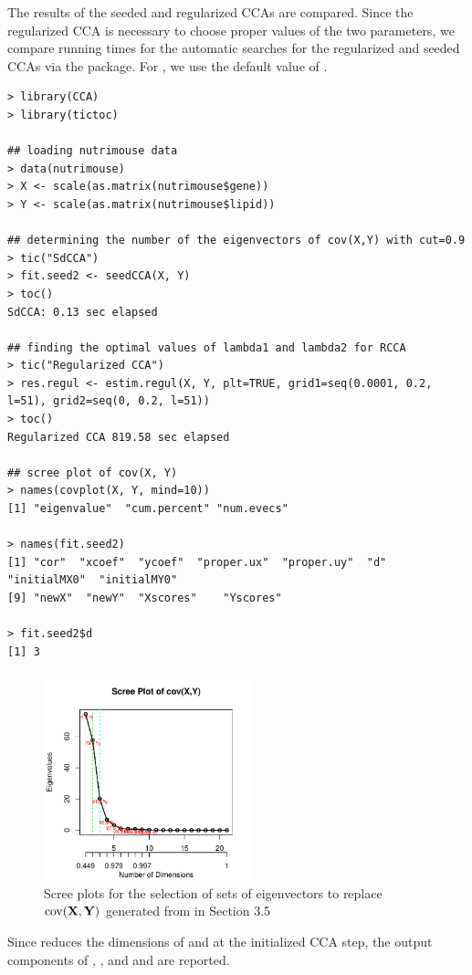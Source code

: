 The results of the seeded and regularized CCAs are compared.
Since the regularized CCA is necessary to choose proper values of the two parameters,
we compare running times for the automatic searches for
the regularized and seeded CCAs via the  package.
For , we use the default value of .
%
\begin{verbatim}
> library(CCA)
> library(tictoc)

## loading nutrimouse data
> data(nutrimouse)
> X <- scale(as.matrix(nutrimouse$gene))
> Y <- scale(as.matrix(nutrimouse$lipid))

## determining the number of the eigenvectors of cov(X,Y) with cut=0.9
> tic("SdCCA")
> fit.seed2 <- seedCCA(X, Y)
> toc()
SdCCA: 0.13 sec elapsed

## finding the optimal values of lambda1 and lambda2 for RCCA
> tic("Regularized CCA")
> res.regul <- estim.regul(X, Y, plt=TRUE, grid1=seq(0.0001, 0.2, l=51), grid2=seq(0, 0.2, l=51))
> toc()
Regularized CCA 819.58 sec elapsed

## scree plot of cov(X, Y)
> names(covplot(X, Y, mind=10))
[1] "eigenvalue"  "cum.percent" "num.evecs"

> names(fit.seed2)
[1] "cor"  "xcoef"  "ycoef"  "proper.ux"  "proper.uy"  "d"  "initialMX0"  "initialMY0"
[9] "newX"  "newY"  "Xscores"    "Yscores"

> fit.seed2$d
[1] 3
\end{verbatim}
%
%
\begin{figure}\begin{center}
\includegraphics[width=6cm,height=6cm]{data2cov10s.pdf}
\vspace{-3mm}\caption{Scree plots for the selection of
sets of eigenvectors to replace $\rm{cov}(\mathbf{X}, \mathbf{Y})$
generated from   in Section 3.5}
\label{data2cov}
\end{center}\end{figure}
%
Since  reduces the dimensions of  and 
at the initialized CCA step, the output components of
, ,  and  and 
are reported.

